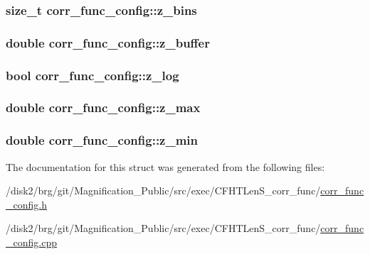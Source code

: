 \subsubsection[{z\+\_\+bins}]{\setlength{\rightskip}{0pt plus 5cm}size\+\_\+t corr\+\_\+func\+\_\+config\+::z\+\_\+bins}\label{structcorr__func__config_ae9f3db83bee5cac291da7de89bdd6297}
\hypertarget{structcorr__func__config_a17340f8a3eaea4875259c98beb8fec7a}{}
\subsubsection[{z\+\_\+buffer}]{\setlength{\rightskip}{0pt plus 5cm}double corr\+\_\+func\+\_\+config\+::z\+\_\+buffer}\label{structcorr__func__config_a17340f8a3eaea4875259c98beb8fec7a}
\hypertarget{structcorr__func__config_a5204dc51747bc18ada4f2c9e26e2ae22}{}
\subsubsection[{z\+\_\+log}]{\setlength{\rightskip}{0pt plus 5cm}bool corr\+\_\+func\+\_\+config\+::z\+\_\+log}\label{structcorr__func__config_a5204dc51747bc18ada4f2c9e26e2ae22}
\hypertarget{structcorr__func__config_aa80df2d7d3aed8c418992ff4648808b6}{}
\subsubsection[{z\+\_\+max}]{\setlength{\rightskip}{0pt plus 5cm}double corr\+\_\+func\+\_\+config\+::z\+\_\+max}\label{structcorr__func__config_aa80df2d7d3aed8c418992ff4648808b6}
\hypertarget{structcorr__func__config_a5ec34a08df3a75740e1c5d39a76a6071}{}
\subsubsection[{z\+\_\+min}]{\setlength{\rightskip}{0pt plus 5cm}double corr\+\_\+func\+\_\+config\+::z\+\_\+min}\label{structcorr__func__config_a5ec34a08df3a75740e1c5d39a76a6071}


The documentation for this struct was generated from the following files\+:\begin{DoxyCompactItemize}
\item 
/disk2/brg/git/\+Magnification\+\_\+\+Public/src/exec/\+C\+F\+H\+T\+Len\+S\+\_\+corr\+\_\+func/\hyperlink{corr__func__config_8h}{corr\+\_\+func\+\_\+config.\+h}\item 
/disk2/brg/git/\+Magnification\+\_\+\+Public/src/exec/\+C\+F\+H\+T\+Len\+S\+\_\+corr\+\_\+func/\hyperlink{corr__func__config_8cpp}{corr\+\_\+func\+\_\+config.\+cpp}\end{DoxyCompactItemize}
